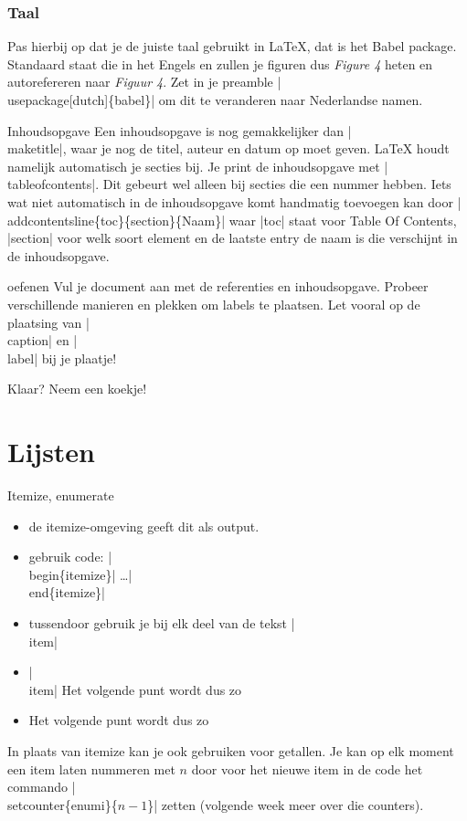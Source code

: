 \documentclass{cursuspresentatie}
\begin{document}
\begin{frame}
	\frametitle{Taal}
	Pas hierbij op dat je de juiste taal gebruikt in \LaTeX, dat is het Babel
	package. Standaard staat die in het Engels en zullen je figuren dus
	\textit{Figure 4} heten en autorefereren naar \textit{Figuur 4}. Zet in je
	preamble \hll|\\usepackage[dutch]\{babel\}| om dit te
	veranderen naar Nederlandse namen.
\end{frame}	

\begin{frame}{Inhoudsopgave}
	Een inhoudsopgave is nog gemakkelijker dan \hll|\\maketitle|, waar je nog de
	titel, auteur en datum op moet geven. \LaTeX{} houdt namelijk automatisch je
	secties bij. Je print de inhoudsopgave met \hll|\\tableofcontents|. Dit
	gebeurt wel alleen bij secties die een nummer hebben. Iets wat niet
	automatisch in de inhoudsopgave komt handmatig toevoegen kan door
    \hll|\\addcontentsline\{toc\}\{section\}\{Naam\}|
    waar \hll|toc| staat voor Table Of Contents, \hll|section| voor welk soort
	element en de laatste entry de naam is die verschijnt in de inhoudsopgave.
\end{frame}

\begin{frame}{oefenen}
	Vul je document aan met de referenties en inhoudsopgave. Probeer
	verschillende manieren en plekken om labels te plaatsen. Let vooral op de
	plaatsing van \hll|\\caption| en \hll|\\label| bij je plaatje!

	Klaar? Neem een koekje!
\end{frame}

\section{Lijsten}
\begin{frame}{Itemize, enumerate}
	\begin{itemize}
		\item de itemize-omgeving geeft dit als output.
		\item gebruik code: \hll|\\begin\{itemize\}| \dots \hll|\\end\{itemize\}|
		\item tussendoor gebruik je bij elk deel van de tekst \hll|\\item|
		\item \hll|\\item| Het volgende punt wordt dus zo
		\item Het volgende punt wordt dus zo
	\end{itemize}
In plaats van itemize kan je ook  gebruiken voor getallen. Je kan
op elk moment een item laten nummeren met $n$ door voor het nieuwe item in de
code het commando \hll|\\setcounter\{enumi\}\{$n-1$\}| zetten
(volgende week meer over die counters).
\end{frame}
\end{document}
